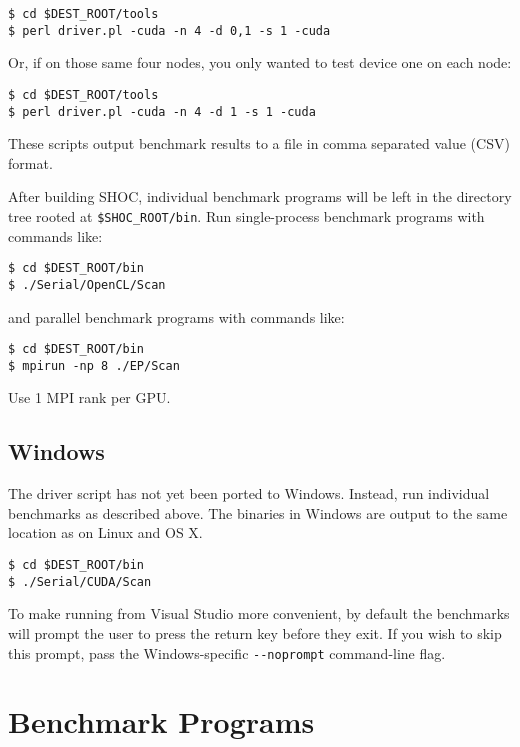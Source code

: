 \documentclass[11pt]{article}
\begin{document}
\begin{Verbatim}[frame=single]
$ cd $DEST_ROOT/tools
$ perl driver.pl -cuda -n 4 -d 0,1 -s 1 -cuda
\end{Verbatim}

Or, if on those same four nodes, you only wanted to test device one on each node:

\begin{Verbatim}[frame=single]
$ cd $DEST_ROOT/tools
$ perl driver.pl -cuda -n 4 -d 1 -s 1 -cuda
\end{Verbatim}

These scripts output benchmark results to a file in comma separated value (CSV) format.

After building SHOC, individual benchmark programs will be left in the
directory tree rooted at \verb+$SHOC_ROOT/bin+.
Run single-process benchmark programs with commands like:

\begin{Verbatim}[frame=single]
$ cd $DEST_ROOT/bin
$ ./Serial/OpenCL/Scan 
\end{Verbatim}

and parallel benchmark programs with commands like:

\begin{Verbatim}[frame=single]
$ cd $DEST_ROOT/bin
$ mpirun -np 8 ./EP/Scan
\end{Verbatim}

Use 1 MPI rank per GPU.  

\subsection{Windows}

The driver script has not yet been ported to Windows.
Instead, run individual benchmarks as described above.
The binaries in Windows are output to the same location
as on Linux and OS X.

\begin{Verbatim}[frame=single]
$ cd $DEST_ROOT/bin
$ ./Serial/CUDA/Scan 
\end{Verbatim}

To make running from Visual Studio more convenient,
by default the benchmarks will prompt the user
to press the return key before they exit.
If you wish to skip this prompt, pass the
Windows-specific \verb+--noprompt+ command-line flag.

\section{Benchmark Programs}\label{sec:programs}
\end{document}
